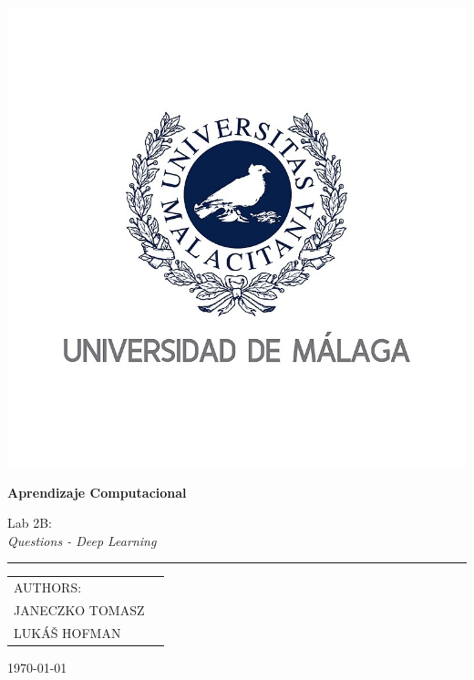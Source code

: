 \documentclass[runningheads]{llncs}
\begin{document}
\begin{titlepage}
\scshape
\centering
\includegraphics[scale=0.57]{logo.png} \par \vspace{0.1cm}
\huge 

{\huge{\textbf{Aprendizaje Computacional}}}\par \vspace{0.4cm}
Lab 2B: \\ \textit{Questions - Deep Learning}
\rule{\textwidth}{2px}

\begin{tabularx}{\textwidth}{X r}
AUTHORS:\\
\large{JANECZKO TOMASZ}   & \\
\large{LUKÁŠ HOFMAN}   &  \\
\end{tabularx}
\vfill
\today

\end{titlepage}

\newpage

\end{document}
